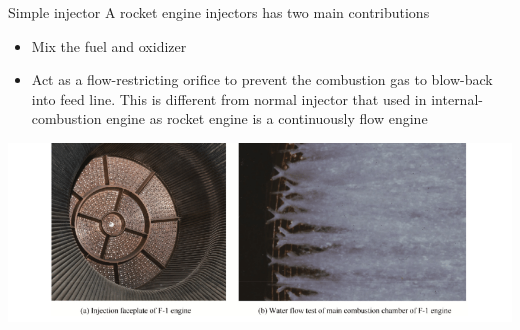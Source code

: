 \documentclass{beamer}
\begin{document}
\begin{frame}{Simple injector}
A rocket engine injectors has two main contributions
    \begin{itemize}
        \item Mix the fuel and oxidizer
        \item Act as a flow-restricting orifice to prevent the combustion gas to blow-back into feed line. This is different from normal injector that used in internal-combustion engine as rocket engine is a continuously flow engine
    \end{itemize}
\centering \includegraphics[height=0.5\textheight]{images/saturn_v_f1_injector.png}
\end{frame}
\end{document}
